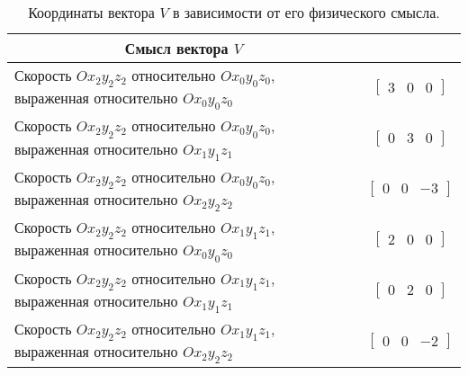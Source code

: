 \begin{table}[h!]
	\caption{Координаты вектора $V$ в зависимости от его физического смысла.}
	\begin{center}
		\begin{tabular}{|m{13cm}|m{3cm}|}
			\hline
			\multicolumn{1}{|c|}{Смысл вектора $V$} & \makebox[3cm]{Значение $V^T$}\\
			\hline
			Скорость $Ox_2y_2z_2$ относительно $Ox_0y_0z_0$, выраженная относительно $Ox_0y_0z_0$ & $$\begin{bmatrix}3 & 0 & 0\end{bmatrix}$$\\
			\hline
			Скорость $Ox_2y_2z_2$ относительно $Ox_0y_0z_0$, выраженная относительно $Ox_1y_1z_1$ & $$\begin{bmatrix}0 & 3 & 0\end{bmatrix}$$\\
			\hline
			Скорость $Ox_2y_2z_2$ относительно $Ox_0y_0z_0$, выраженная относительно $Ox_2y_2z_2$ & $$\begin{bmatrix}0 & 0 & -3\end{bmatrix}$$\\
			\hline
			Скорость $Ox_2y_2z_2$ относительно $Ox_1y_1z_1$, выраженная относительно $Ox_0y_0z_0$ & $$\begin{bmatrix}2 & 0 & 0\end{bmatrix}$$\\
			\hline
			Скорость $Ox_2y_2z_2$ относительно $Ox_1y_1z_1$, выраженная относительно $Ox_1y_1z_1$ & $$\begin{bmatrix}0 & 2 & 0\end{bmatrix}$$\\
			\hline
			Скорость $Ox_2y_2z_2$ относительно $Ox_1y_1z_1$, выраженная относительно $Ox_2y_2z_2$ & $$\begin{bmatrix}0 & 0 & -2\end{bmatrix}$$\\
			\hline
		\end{tabular}
	\end{center}
	\label{table_values_of_v}
\end{table}

